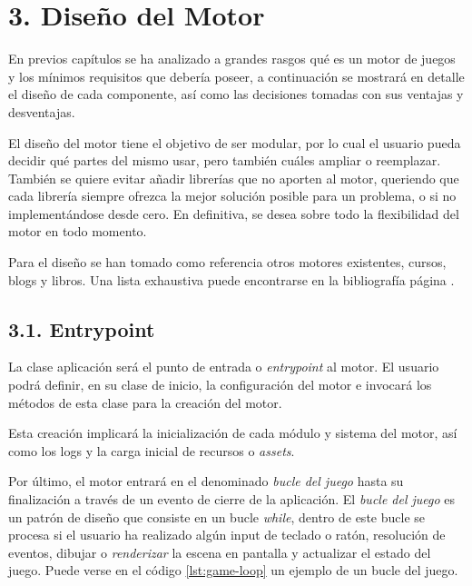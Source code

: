 \chapter*{3. Diseño del Motor}\label{cap:design}

En previos capítulos se ha analizado a grandes rasgos qué es un motor de 
juegos y los mínimos requisitos que debería poseer, a continuación se mostrará en detalle el
diseño de cada componente, así como las decisiones tomadas con sus ventajas y desventajas.

El diseño del motor tiene el objetivo de ser modular, por lo cual el usuario pueda decidir qué partes del mismo usar, 
pero también cuáles ampliar o reemplazar. También se quiere evitar añadir librerías que no aporten al motor, 
queriendo que cada librería siempre ofrezca la mejor solución posible para un problema, o si no implementándose desde cero.
En definitiva, se desea sobre todo la flexibilidad del motor en todo momento.

Para el diseño se han tomado como referencia otros motores existentes, cursos, blogs y libros\cite{hazel}\cite{master-course}\cite{engine-book}\cite{game-patterns}. Una lista
exhaustiva puede encontrarse en la bibliografía página \pageref{cap:bibliography}.

\section*{3.1. Entrypoint}\label{sec:entrypoint}
La clase aplicación será el punto de entrada o \textit{entrypoint} al motor. El usuario podrá definir, en su clase de inicio, 
la configuración del motor e invocará los métodos de esta clase para la creación del motor. 

Esta creación implicará la inicialización de cada módulo y sistema del motor, así como los logs y la carga inicial
de recursos o \textit{assets}. 

Por último, el motor entrará en el denominado \textit{bucle del juego} hasta su finalización a través de un evento
de cierre de la aplicación. El \textit{bucle del juego} es un patrón de diseño\cite{game-loop-pattern} que consiste
en un bucle \textit{while}, dentro de este bucle se procesa si el usuario ha realizado algún input de teclado o ratón,
resolución de eventos, dibujar o \textit{renderizar} la escena en pantalla y actualizar el estado del juego.
Puede verse en el código \ref{lst:game-loop} un ejemplo de un bucle del juego.

